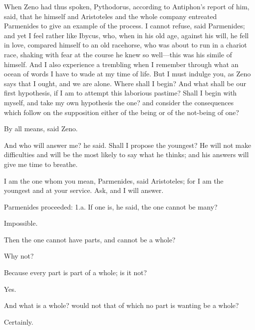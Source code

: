 \documentclass[11pt,letter]{article}
\begin{document}
\par  When Zeno had thus spoken, Pythodorus, according to Antiphon's report of him, said, that he himself and Aristoteles and the whole company entreated Parmenides to give an example of the process. I cannot refuse, said Parmenides; and yet I feel rather like Ibycus, who, when in his old age, against his will, he fell in love, compared himself to an old racehorse, who was about to run in a chariot race, shaking with fear at the course he knew so well—this was his simile of himself. And I also experience a trembling when I remember through what an ocean of words I have to wade at my time of life. But I must indulge you, as Zeno says that I ought, and we are alone. Where shall I begin? And what shall be our first hypothesis, if I am to attempt this laborious pastime? Shall I begin with myself, and take my own hypothesis the one? and consider the consequences which follow on the supposition either of the being or of the not-being of one?

\par  By all means, said Zeno.

\par  And who will answer me? he said. Shall I propose the youngest? He will not make difficulties and will be the most likely to say what he thinks; and his answers will give me time to breathe.

\par  I am the one whom you mean, Parmenides, said Aristoteles; for I am the youngest and at your service. Ask, and I will answer.

\par  Parmenides proceeded: 1.a. If one is, he said, the one cannot be many?

\par  Impossible.

\par  Then the one cannot have parts, and cannot be a whole?

\par  Why not?

\par  Because every part is part of a whole; is it not?

\par  Yes.

\par  And what is a whole? would not that of which no part is wanting be a whole?

\par  Certainly.
\end{document}
